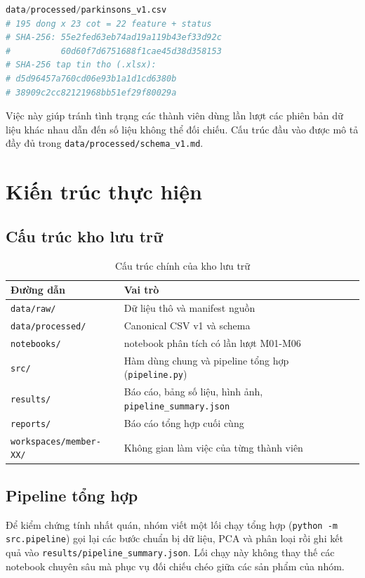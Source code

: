 \begin{lstlisting}[language=Python, numbers=none]
data/processed/parkinsons_v1.csv
# 195 dong x 23 cot = 22 feature + status
# SHA-256: 55e2fed63eb74ad19a119b43ef33d92c
#          60d60f7d6751688f1cae45d38d358153
# SHA-256 tap tin tho (.xlsx):
# d5d96457a760cd06e93b1a1d1cd6380b
# 38909c2cc82121968bb51ef29f80029a
\end{lstlisting}

Việc này giúp tránh tình trạng các thành viên dùng lần lượt các phiên bản dữ liệu khác nhau
dẫn đến số liệu không thể đối chiếu. Cấu trúc đầu vào được mô tả đầy đủ trong
\texttt{data/processed/}\allowbreak\texttt{schema\_v1.md}.

\section{Kiến trúc thực hiện}

\subsection{Cấu trúc kho lưu trữ}

\begin{table}[H]
\centering
\caption{Cấu trúc chính của kho lưu trữ}
\begin{tabular}{|l|>{\raggedright\arraybackslash}p{8.6cm}|}
\hline
\textbf{Đường dẫn} & \textbf{Vai trò} \\
\hline
\texttt{data/raw/} & Dữ liệu thô và manifest nguồn \\
\hline
\texttt{data/processed/} & Canonical CSV v1 và schema \\
\hline
\texttt{notebooks/} & 5 notebook phân tích có lần lượt M01-M06 \\
\hline
\texttt{src/} & Hàm dùng chung và pipeline tổng hợp (\texttt{pipeline.py}) \\
\hline
\texttt{results/} & Báo cáo, bảng số liệu, hình ảnh, \texttt{pipeline\_summary.json} \\
\hline
\texttt{reports/} & Báo cáo tổng hợp cuối cùng \\
\hline
\texttt{workspaces/member-XX/} & Không gian làm việc của từng thành viên \\
\hline
\end{tabular}
\end{table}

\subsection{Pipeline tổng hợp}
Để kiểm chứng tính nhất quán, nhóm viết một lối chạy tổng hợp
(\texttt{python -m src.pipeline}) gọi lại các bước chuẩn bị dữ liệu, PCA và phân loại rồi
ghi kết quả vào \texttt{results/}\allowbreak\texttt{pipeline\_summary.json}. Lối chạy này không thay thế các
notebook chuyên sâu mà phục vụ đối chiếu chéo giữa các sản phẩm của nhóm.


